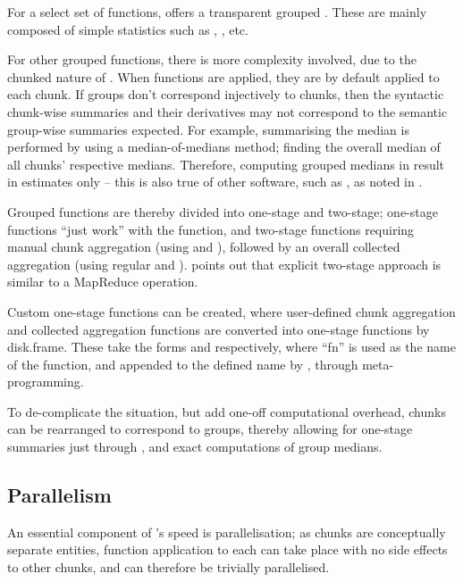 For a select set of functions,  offers a transparent grouped .
These are mainly composed of simple statistics such as , , etc.

For other grouped functions, there is more complexity involved, due to the chunked nature of .
When functions are applied, they are by default applied to each chunk.
If groups don't correspond injectively to chunks, then the syntactic chunk-wise summaries and their derivatives may not correspond to the semantic group-wise summaries expected.
For example, summarising the median is performed by using a median-of-medians method; finding the overall median of all chunks' respective medians.
Therefore, computing grouped medians in  result in estimates only -- this is also true of other software, such as , as noted in \textcite{zj19:_group_by}.

Grouped functions are thereby divided into one-stage and two-stage; one-stage functions ``just work'' with the  function, and two-stage functions requiring manual chunk aggregation (using  and ), followed by an overall collected aggregation (using regular  and ).
\Textcite{zj19:_group_by}
points out that explicit two-stage approach is similar to a MapReduce
operation.

Custom one-stage functions can be created, where user-defined chunk aggregation and collected aggregation functions are converted into one-stage functions by disk.frame\cite{zj19:_custom_one_stage_group_by_funct}.
These take the forms  and  respectively, where ``fn'' is used as the name of the function, and appended to the defined name by , through meta-programming.

To de-complicate the situation, but add one-off computational overhead, chunks can be rearranged to correspond to groups, thereby allowing for one-stage summaries just through , and exact computations of group medians.

\subsection{Parallelism}\label{sec:parallelisation}

An essential component of 's speed is parallelisation; as chunks are conceptually separate entities, function application to each can take place with no side effects to other chunks, and can therefore be trivially parallelised.

